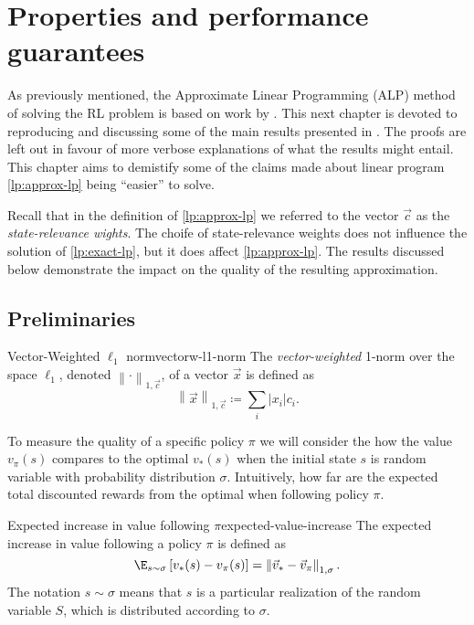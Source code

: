 \chapter{Properties and performance guarantees}
\label{chapter:PropertiesGuarantees}

As previously mentioned, the Approximate Linear Programming (ALP) method of
solving the RL problem is based on work by \citeauthor{farias2003LP2ADP}. This
next chapter is devoted to reproducing and discussing some of the main results
presented in \cite{farias2003LP2ADP}. The proofs are left out in favour of more
verbose explanations of what the results might entail. This chapter aims to
demistify some of the claims made about linear program \eqref{lp:approx-lp}
being ``easier'' to solve.

Recall that in the definition of \eqref{lp:approx-lp} we referred to the vector
$\vec{c}$ as the \emph{state-relevance wights}. The choife of state-relevance
weights does not influence the solution of \eqref{lp:exact-lp}, but it does
affect \eqref{lp:approx-lp}. The results discussed below demonstrate the impact
on the quality of the resulting approximation.

\section{Preliminaries}

\begin{dfn}{Vector-Weighted $\ell_1$ norm}{vectorw-l1-norm}
    The \emph{vector-weighted} 1-norm over the space $\ell_1$, denoted $\left\| \cdot \right\|_{1, \vec{c}}$, of a vector $\vec{x}$ is defined as
    \begin{equation*}
        \left\| \vec{x} \right\|_{1, \vec{c}} \coloneqq  \sum_i |x_i| c_i.
    \end{equation*}
\end{dfn}

To measure the quality of a specific policy $\pi$ we will consider the how the
value $v_\pi(s)$ compares to the optimal $v_* (s)$ when the initial state $s$ is
random variable with probability distribution $\sigma$. Intuitively, how far are
the expected total discounted rewards from the optimal when following policy
$\pi$.

\begin{dfn}{Expected increase in value following $\pi$}{expected-value-increase}
    The expected increase in value following a policy $\pi$ is defined as
    \begin{equation}
        \label{eq:expected-value-increase}
        \E_{s \sim \sigma} \left[ v_* (s) - v_\pi (s) \right] = \left\| \vec{v
        }_* - \vec{v}_\pi \right\|_{1, \sigma}.
    \end{equation}
    The notation $s \sim \sigma$ means that $s$ is a particular realization of the
    random variable $S$, which is distributed according to $\sigma$.
\end{dfn}

